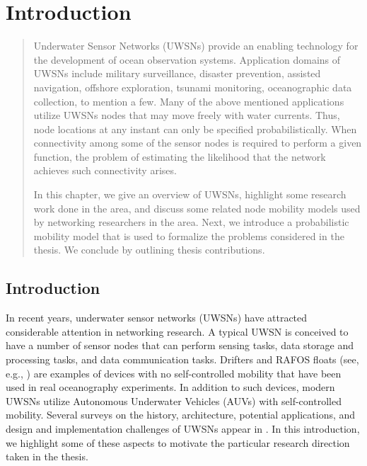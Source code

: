 \chapter{Introduction}
\titlespacing*{\chapter}{0pt}{-50pt}{40pt}
\label{Chapter1} %


\begin{quotation}
Underwater Sensor Networks (UWSNs) provide an enabling technology for the development of ocean observation systems. Application domains of UWSNs include military surveillance, disaster prevention, assisted navigation, offshore exploration, tsunami monitoring, oceanographic data collection, to mention a few. Many of the above mentioned applications utilize UWSNs nodes that may move freely with water currents. Thus, node locations at any instant can only be specified probabilistically. When connectivity among some of the sensor nodes is required to perform a given function, the problem of estimating the likelihood that the network achieves such connectivity arises.

In this chapter, we give an overview of UWSNs, highlight some research work done in the area, and discuss some related node mobility  models used by networking researchers in the area. Next, we introduce a probabilistic mobility model that is used to formalize the problems considered in the thesis. We conclude by outlining thesis contributions.
 \end{quotation}
\section{Introduction}
\label{ch1:intro}
In recent years, underwater sensor networks (UWSNs) have attracted considerable attention in networking research.
A typical UWSN is conceived to have a number of sensor nodes that can perform sensing tasks, data storage and processing tasks, and data communication tasks.
Drifters and RAFOS floats (see, e.g., \cite{bower1989evidence}) are examples of devices with no self-controlled mobility that have been used in real oceanography experiments. In addition to such devices, modern UWSNs utilize Autonomous Underwater Vehicles (AUVs) with self-controlled mobility.
Several surveys on the history, architecture, potential applications, and design and implementation challenges of UWSNs appear in \cite{akyildiz2005underwater, partan2007survey, heidemann2012underwater, climent2014underwater, gkikopouli2012survey}.
In this introduction, we highlight some of these aspects to motivate the particular research direction taken in the thesis.



